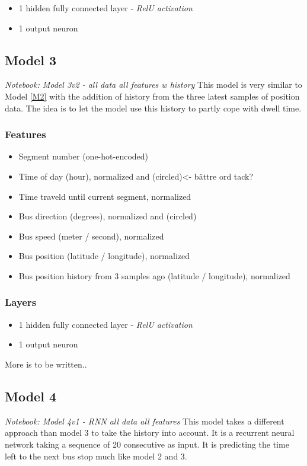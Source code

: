 \begin{itemize}
    \item 1 hidden fully connected layer - \textit{RelU activation}
    \item 1 output neuron
\end{itemize}


\subsection{Model 3}\label{M3}
\textit{Notebook: Model 3v2 - all data all features w history}
\noindent This model is very similar to Model \ref{M2} with the addition of history from the three latest samples of position data. The idea is to let the model use this history to partly cope with dwell time.

\subsubsection{Features}

\begin{itemize}
    \item Segment number (one-hot-encoded)
    \item Time of day (hour), normalized and (circled)<- bättre ord tack?
    \item Time traveld until current segment, normalized
    \item Bus direction (degrees), normalized and (circled)
    \item Bus speed (meter / second), normalized
    \item Bus position (latitude / longitude), normalized
    \item Bus position history from 3 samples ago (latitude / longitude), normalized
\end{itemize}

\subsubsection{Layers}

\begin{itemize}
    \item 1 hidden fully connected layer - \textit{RelU activation}
    \item 1 output neuron
\end{itemize}

More is to be written..

\subsection{Model 4}
\textit{Notebook: Model 4v1 - RNN all data all features}
\newline
\noindent This model takes a different approach than model 3 to take the history into account. It is a recurrent neural network taking a sequence of 20 consecutive as input. It is predicting the time left to the next bus stop much like model 2 and 3.


